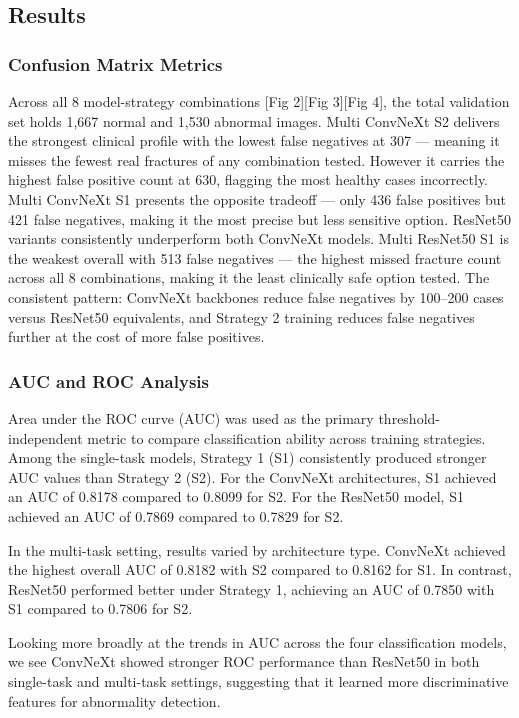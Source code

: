 \documentclass[conference]{IEEEtran}
\begin{document}
\subsection{\textbf{Results}}

\subsubsection{Confusion Matrix Metrics}
Across all 8 model-strategy combinations [Fig 2][Fig 3][Fig 4], the total validation set holds 1,667 normal and 1,530 abnormal images. Multi ConvNeXt S2 delivers the strongest clinical profile with the lowest false negatives at 307 — meaning it misses the fewest real fractures of any combination tested. However it carries the highest false positive count at 630, flagging the most healthy cases incorrectly.
Multi ConvNeXt S1 presents the opposite tradeoff — only 436 false positives but 421 false negatives, making it the most precise but less sensitive option.
ResNet50 variants consistently underperform both ConvNeXt models. Multi ResNet50 S1 is the weakest overall with 513 false negatives — the highest missed fracture count across all 8 combinations, making it the least clinically safe option tested.
The consistent pattern: ConvNeXt backbones reduce false negatives by 100–200 cases versus ResNet50 equivalents, and Strategy 2 training reduces false negatives further at the cost of more false positives.

\subsubsection{AUC and ROC Analysis}
Area under the ROC curve (AUC) was used as the primary threshold-independent metric to compare classification ability across training strategies. Among the single-task models, Strategy 1 (S1) consistently produced stronger AUC values than Strategy 2 (S2). For the ConvNeXt architectures, S1 achieved an AUC of 0.8178 compared to 0.8099 for S2. For the ResNet50 model, S1 achieved an AUC of 0.7869 compared to 0.7829 for S2.

In the multi-task setting, results varied by architecture type. ConvNeXt achieved the highest overall AUC of 0.8182 with S2 compared to 0.8162 for S1. In contrast, ResNet50 performed better under Strategy 1, achieving an AUC of 0.7850 with S1 compared to 0.7806 for S2. 

Looking more broadly at the trends in AUC across the four classification models, we see ConvNeXt showed stronger ROC performance than ResNet50 in both single-task and multi-task settings, suggesting that it learned more discriminative features for abnormality detection. 
\end{document}
